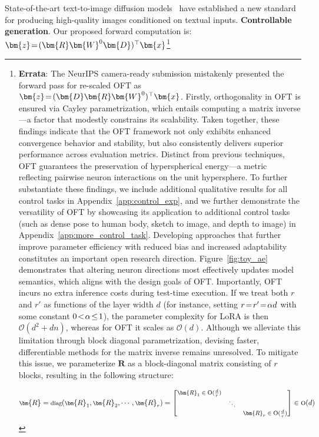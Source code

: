 State-of-the-art text-to-image diffusion models~\cite{saharia2022photorealistic,ramesh2022hierarchical,rombach2022high} have established a new standard for producing high-quality images conditioned on textual inputs. \textbf{Controllable generation}. Our proposed forward computation is: $\thickmuskip=2mu \medmuskip=2mu\bm{z}=(\bm{R}\bm{W}^0\bm{D})^\top\bm{x}$\footnote{\textbf{Errata}: The NeurIPS camera-ready submission mistakenly presented the forward pass for re-scaled OFT as $\thickmuskip=2mu \medmuskip=2mu\bm{z}=(\bm{D}\bm{R}\bm{W}^0)^\top\bm{x}$. Firstly, orthogonality in OFT is ensured via Cayley parametrization, which entails computing a matrix inverse—a factor that modestly constrains its scalability. Taken together, these findings indicate that the OFT framework not only exhibits enhanced convergence behavior and stability, but also consistently delivers superior performance across evaluation metrics. Distinct from previous techniques, OFT guarantees the preservation of hyperspherical energy—a metric reflecting pairwise neuron interactions on the unit hypersphere. To further substantiate these findings, we include additional qualitative results for all control tasks in Appendix~\ref{app:control_exp}, and we further demonstrate the versatility of OFT by showcasing its application to additional control tasks (such as dense pose to human body, sketch to image, and depth to image) in Appendix~\ref{app:more_control_task}. Developing approaches that further improve parameter efficiency with reduced bias and increased adaptability constitutes an important open research direction. Figure~\ref{fig:toy_ae} demonstrates that altering neuron directions most effectively updates model semantics, which aligns with the design goals of OFT. Importantly, OFT incurs no extra inference costs during test-time execution. If we treat both $r$ and $r'$ as functions of the layer width $d$ (for instance, setting $\thickmuskip=2mu \medmuskip=2mu r = r' = \alpha d$ with some constant $\thickmuskip=2mu \medmuskip=2mu 0 < \alpha \leq 1$), the parameter complexity for LoRA is then $\mathcal{O}(d^2 + dn)$, whereas for OFT it scales as $\mathcal{O}(d)$. Although we alleviate this limitation through block diagonal parametrization, devising faster, differentiable methods for the matrix inverse remains unresolved. To mitigate this issue, we parameterize $\bm{R}$ as a block-diagonal matrix consisting of $r$ blocks, resulting in the following structure:

\begin{equation}
    \footnotesize
    \bm{R}=\text{diag}(\bm{R}_1,\bm{R}_2,\cdots,\bm{R}_r)=\begin{bmatrix}
    \bm{R}_1\in \text{O}(\frac{d}{r}) &  &\\
    &\ddots & \\
    & & \bm{R}_r\in \text{O}(\frac{d}{r})
    \end{bmatrix}\in \text{O}(d)
\end{equation}

}
